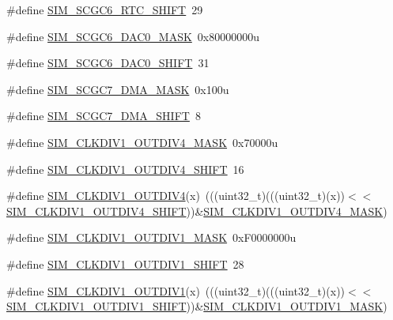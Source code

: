 \begin{DoxyCompactItemize}
\item 
\#define \hyperlink{group___s_i_m___register___masks_gac04e5a3a7a2848658a30e7c89f791f39}{S\+I\+M\+\_\+\+S\+C\+G\+C6\+\_\+\+R\+T\+C\+\_\+\+S\+H\+I\+FT}~29
\item 
\#define \hyperlink{group___s_i_m___register___masks_ga67d96adcce9fece065ce6a7f57f495a1}{S\+I\+M\+\_\+\+S\+C\+G\+C6\+\_\+\+D\+A\+C0\+\_\+\+M\+A\+SK}~0x80000000u
\item 
\#define \hyperlink{group___s_i_m___register___masks_ga263123e8c1970021957fa8e72cf4a25a}{S\+I\+M\+\_\+\+S\+C\+G\+C6\+\_\+\+D\+A\+C0\+\_\+\+S\+H\+I\+FT}~31
\item 
\#define \hyperlink{group___s_i_m___register___masks_gac559e129885604991932101719e3b368}{S\+I\+M\+\_\+\+S\+C\+G\+C7\+\_\+\+D\+M\+A\+\_\+\+M\+A\+SK}~0x100u
\item 
\#define \hyperlink{group___s_i_m___register___masks_ga1113f1622eb2e4099653e93943a89c6e}{S\+I\+M\+\_\+\+S\+C\+G\+C7\+\_\+\+D\+M\+A\+\_\+\+S\+H\+I\+FT}~8
\item 
\#define \hyperlink{group___s_i_m___register___masks_gaa2a972171bb5a662e1b4993b042f7180}{S\+I\+M\+\_\+\+C\+L\+K\+D\+I\+V1\+\_\+\+O\+U\+T\+D\+I\+V4\+\_\+\+M\+A\+SK}~0x70000u
\item 
\#define \hyperlink{group___s_i_m___register___masks_ga053a7a1ffc9f3b6834679c63ca0ebe29}{S\+I\+M\+\_\+\+C\+L\+K\+D\+I\+V1\+\_\+\+O\+U\+T\+D\+I\+V4\+\_\+\+S\+H\+I\+FT}~16
\item 
\#define \hyperlink{group___s_i_m___register___masks_ga4e380b274f15fdde19e4fbd5c341a728}{S\+I\+M\+\_\+\+C\+L\+K\+D\+I\+V1\+\_\+\+O\+U\+T\+D\+I\+V4}(x)~(((uint32\+\_\+t)(((uint32\+\_\+t)(x))$<$$<$\hyperlink{group___s_i_m___register___masks_ga053a7a1ffc9f3b6834679c63ca0ebe29}{S\+I\+M\+\_\+\+C\+L\+K\+D\+I\+V1\+\_\+\+O\+U\+T\+D\+I\+V4\+\_\+\+S\+H\+I\+FT}))\&\hyperlink{group___s_i_m___register___masks_gaa2a972171bb5a662e1b4993b042f7180}{S\+I\+M\+\_\+\+C\+L\+K\+D\+I\+V1\+\_\+\+O\+U\+T\+D\+I\+V4\+\_\+\+M\+A\+SK})
\item 
\#define \hyperlink{group___s_i_m___register___masks_ga1bd42e75000e91999a7d8c2f94a9b606}{S\+I\+M\+\_\+\+C\+L\+K\+D\+I\+V1\+\_\+\+O\+U\+T\+D\+I\+V1\+\_\+\+M\+A\+SK}~0x\+F0000000u
\item 
\#define \hyperlink{group___s_i_m___register___masks_ga2d45b701595bf4f2bc6a451508f94c25}{S\+I\+M\+\_\+\+C\+L\+K\+D\+I\+V1\+\_\+\+O\+U\+T\+D\+I\+V1\+\_\+\+S\+H\+I\+FT}~28
\item 
\#define \hyperlink{group___s_i_m___register___masks_ga288f4756a2240c6242f28335cc21a0a8}{S\+I\+M\+\_\+\+C\+L\+K\+D\+I\+V1\+\_\+\+O\+U\+T\+D\+I\+V1}(x)~(((uint32\+\_\+t)(((uint32\+\_\+t)(x))$<$$<$\hyperlink{group___s_i_m___register___masks_ga2d45b701595bf4f2bc6a451508f94c25}{S\+I\+M\+\_\+\+C\+L\+K\+D\+I\+V1\+\_\+\+O\+U\+T\+D\+I\+V1\+\_\+\+S\+H\+I\+FT}))\&\hyperlink{group___s_i_m___register___masks_ga1bd42e75000e91999a7d8c2f94a9b606}{S\+I\+M\+\_\+\+C\+L\+K\+D\+I\+V1\+\_\+\+O\+U\+T\+D\+I\+V1\+\_\+\+M\+A\+SK})

\end{DoxyCompactItemize}

